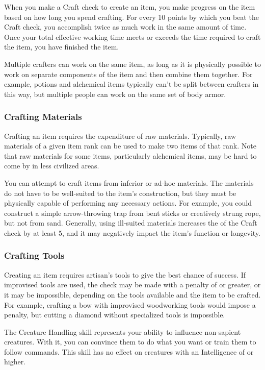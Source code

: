       When you make a Craft check to create an item, you make progress on the item based on how long you spend crafting.
      For every 10 points by which you beat the Craft check, you accomplish twice as much work in the same amount of time.
      Once your total effective working time meets or exceeds the time required to craft the item, you have finished the item.

      Multiple crafters can work on the same item, as long as it is physically possible to work on separate components of the item and then combine them together.
      For example, potions and alchemical items typically can't be split between crafters in this way, but multiple people can work on the same set of body armor.

    \subsubsection{Crafting Materials}
      Crafting an item requires the expenditure of raw materials.
      Typically, raw materials of a given item rank can be used to make two items of that rank.
      Note that raw materials for some items, particularly alchemical items, may be hard to come by in less civilized areas.

      You can attempt to craft items from inferior or ad-hoc materials.
      The materials do not have to be well-suited to the item's construction, but they must be physically capable of performing any necessary actions.
      For example, you could construct a simple arrow-throwing trap from bent sticks or creatively strung rope, but not from sand.
      Generally, using ill-suited materials increases the  of the Craft check by at least 5, and it may negatively impact the item's function or longevity.

    \subsubsection{Crafting Tools}
      Creating an item requires artisan's tools to give the best chance of success.
      If improvised tools are used, the check may be made with a penalty of  or greater, or it may be impossible, depending on the tools available and the item to be crafted.
      For example, crafting a bow with improvised woodworking tools would impose a  penalty, but cutting a diamond without specialized tools is impossible.

\newpage
{}
  The Creature Handling skill represents your ability to influence non-sapient creatures.
  With it, you can convince them to do what you want or train them to follow commands.
  This skill has no effect on creatures with an Intelligence of  or higher.

